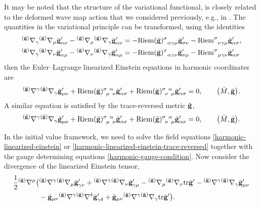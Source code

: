 \documentclass[pdftex]{sigma}
\def\grad{{\nabla}}%
\newcommand{\leftexp}[2]{{\vphantom{#2}}^{#1}{#2}}
\def\halb{\frac{1}{2}}%
\def \gm{\gamma}
\def \a{\alpha}
\renewcommand{\gg}{{\bf g}}
\newcommand{\bgg}{{\bar{\bf g}}}
\newcommand{\tgg}{{\tilde{\bf g}}}
\renewcommand{\a}{\alpha}
\renewcommand{\d}{\delta}
\numberwithin{equation}{section}
\begin{document}
It may be noted that the structure of the variational functional, is closely related to the deformed wave map action that we considered previously, e.g., in \cite{NG_19_2}. The quantities in the variational principle can be transformed, using the identities
\begin{align*}
&\leftexp{(\bar{\gg})}{\grad}_\gamma \leftexp{(\bar{\gg})}{\grad}_\mu \bgg'_{\a \nu} - \leftexp{(\bar{\gg})}{\grad}_\mu \leftexp{(\bar{\gg})}{\grad}_\gm \bgg'_{\a \nu} = -{\rm Riem}(\bgg)^\sigma_{\,\,\,\,\a \gm \mu} \bgg'_{\sigma \nu} - {\rm Riem}^\sigma_{\,\,\,\, \nu \gm \mu} \bgg'_{\a \sigma}, \notag\\
&\leftexp{(\bar{\gg})}{\grad}_\gamma \leftexp{(\bar{\gg})}{\grad}_\nu \bgg'_{\a \mu} - \leftexp{(\bar{\gg})}{\grad}_\nu \leftexp{(\bar{\gg})}{\grad}_\gm \bgg'_{\a \mu} = -{\rm Riem}(\bgg)^\sigma_{\,\,\,\,\a \gm \nu} \bgg'_{\sigma \mu} - {\rm Riem}^\sigma_{\,\,\,\, \mu \gm \nu} \bgg'_{\a \sigma}
\end{align*}
then the Euler--Lagrange linearized Einstein equations in harmonic coordinates are
\begin{align} \label{harmonic-linearized-einstein}
\leftexp{(\bgg)}{\grad}^\gm \leftexp{(\bar{\gg})}{\grad}_\gm \bgg'_{\mu \nu} + {\rm Riem}(\bgg)^{\sigma \,\,\,\a}_{\,\,\,\mu\,\,\,\nu} \bgg'_{\a \sigma} + {\rm Riem}(\bgg)^{\sigma \,\,\,\a}_{\,\,\,\nu\,\,\,\mu} \bgg'_{\a \sigma} =0, \qquad \bigl(\bar{M}, \bgg\bigr).
\end{align}
A similar equation is satisfied by the trace-reversed metric $\tgg$,
\begin{align} \label{harmonic-linearized-einstein-trace-reversed}
\leftexp{(\bgg)}{\grad}^\gm \leftexp{(\bar{\gg})}{\grad}_\gm \tgg'_{\mu \nu} + {\rm Riem}(\bgg)^{\sigma \,\,\,\a}_{\,\,\,\mu\,\,\,\nu} \tgg'_{\a \sigma} + {\rm Riem}(\tgg)^{\sigma \,\,\,\a}_{\,\,\,\nu\,\,\,\mu} \tgg'_{\a \sigma} =0, \qquad \bigl(\bar{M}, \bgg\bigr).
\end{align}

In the initial value framework, we need to solve the field equations \eqref{harmonic-linearized-einstein} or \eqref{harmonic-linearized-einstein-trace-reversed} together with the gauge determining equations \eqref{harmonic-gauge-condition}.
Now consider the divergence of the linearized Einstein tensor,
\begin{align*}
&\halb \leftexp{(\bgg)}{\grad}^ \mu \bigl( \leftexp{(\bgg)}{\grad}^\gm \leftexp{(\bgg)}{\grad}_\mu \bgg'_{ \gm \nu} + \leftexp{(\bgg)}{\grad}^\gm \leftexp{(\bgg)}{\grad}_\nu \bgg'_{\gm \mu} - \leftexp{(\bgg)}{\grad}_\mu \leftexp{(\bgg)}{\grad}_\nu {\rm tr}\bgg' - \leftexp{(\bgg)}{\grad}^\gm \leftexp{(\bgg)}{\grad}_\gm \bgg'_{ \mu \nu} \notag\\
&\hphantom{\halb \leftexp{(\bgg)}{\grad}^ \mu \bigl(}{}
- \bgg_{\mu \nu} \leftexp{(\bgg)}{\grad}^\gm \leftexp{(\bgg)}{\grad}^\d \bgg'_{ \gm \d} + \bgg_{\mu \nu} \leftexp{(\bgg)}{\grad}^\gm \leftexp{(\bgg)}{\grad}_\gm {\rm tr} \bgg' \bigr).
\end{align*}
\end{document}
